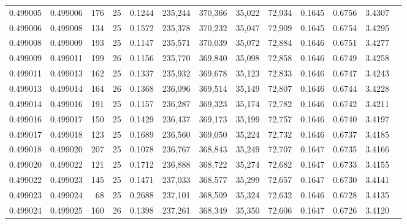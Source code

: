 \begin{tabular}{rrrrrrrrrrrrr}
0.499005 & 0.499006 & 176 &  25 &                                     0.1244 & 235,244 & 370,366 &  35,022 &  72,934 & 0.1645 & 0.6756 & 3.4307 \\
0.499006 & 0.499008 & 134 &  25 &                                     0.1572 & 235,378 & 370,232 &  35,047 &  72,909 & 0.1645 & 0.6754 & 3.4295 \\
0.499008 & 0.499009 & 193 &  25 &                                     0.1147 & 235,571 & 370,039 &  35,072 &  72,884 & 0.1646 & 0.6751 & 3.4277 \\
0.499009 & 0.499011 & 199 &  26 &                                     0.1156 & 235,770 & 369,840 &  35,098 &  72,858 & 0.1646 & 0.6749 & 3.4258 \\
0.499011 & 0.499013 & 162 &  25 &                                     0.1337 & 235,932 & 369,678 &  35,123 &  72,833 & 0.1646 & 0.6747 & 3.4243 \\
0.499013 & 0.499014 & 164 &  26 &                                     0.1368 & 236,096 & 369,514 &  35,149 &  72,807 & 0.1646 & 0.6744 & 3.4228 \\
0.499014 & 0.499016 & 191 &  25 &                                     0.1157 & 236,287 & 369,323 &  35,174 &  72,782 & 0.1646 & 0.6742 & 3.4211 \\
0.499016 & 0.499017 & 150 &  25 &                                     0.1429 & 236,437 & 369,173 &  35,199 &  72,757 & 0.1646 & 0.6740 & 3.4197 \\
0.499017 & 0.499018 & 123 &  25 &                                     0.1689 & 236,560 & 369,050 &  35,224 &  72,732 & 0.1646 & 0.6737 & 3.4185 \\
0.499018 & 0.499020 & 207 &  25 &                                     0.1078 & 236,767 & 368,843 &  35,249 &  72,707 & 0.1647 & 0.6735 & 3.4166 \\
0.499020 & 0.499022 & 121 &  25 &                                     0.1712 & 236,888 & 368,722 &  35,274 &  72,682 & 0.1647 & 0.6733 & 3.4155 \\
0.499022 & 0.499023 & 145 &  25 &                                     0.1471 & 237,033 & 368,577 &  35,299 &  72,657 & 0.1647 & 0.6730 & 3.4141 \\
0.499023 & 0.499024 &  68 &  25 &                                     0.2688 & 237,101 & 368,509 &  35,324 &  72,632 & 0.1646 & 0.6728 & 3.4135 \\
0.499024 & 0.499025 & 160 &  26 &                                     0.1398 & 237,261 & 368,349 &  35,350 &  72,606 & 0.1647 & 0.6726 & 3.4120 \\

\end{tabular}
